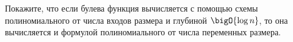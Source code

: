 Покажите, что если булева функция вычисляется с помощью схемы полиномиального от числа входов размера и
глубиной $\bigO{\log n}$, то она вычисляется и формулой полиномиального от числа переменных размера.
